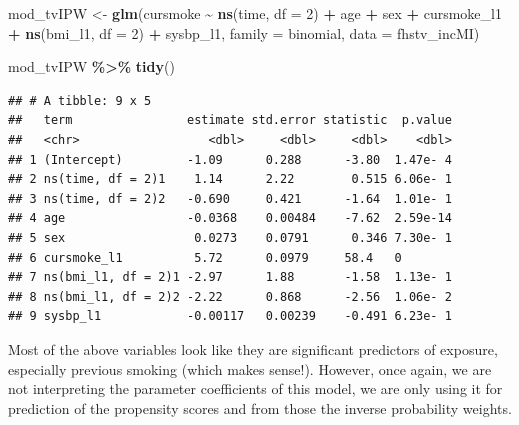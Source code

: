 \documentclass[
]{book}
\newenvironment{Shaded}{\begin{snugshade}}{\end{snugshade}}
\newcommand{\AttributeTok}[1]{\textcolor[rgb]{0.13,0.29,0.53}{#1}}
\newcommand{\DecValTok}[1]{\textcolor[rgb]{0.00,0.00,0.81}{#1}}
\newcommand{\FunctionTok}[1]{\textcolor[rgb]{0.13,0.29,0.53}{\textbf{#1}}}
\newcommand{\NormalTok}[1]{#1}
\newcommand{\OtherTok}[1]{\textcolor[rgb]{0.56,0.35,0.01}{#1}}
\newcommand{\SpecialCharTok}[1]{\textcolor[rgb]{0.81,0.36,0.00}{\textbf{#1}}}
\begin{document}
\begin{Shaded}
\begin{Highlighting}[]
\NormalTok{mod\_tvIPW }\OtherTok{\textless{}{-}} \FunctionTok{glm}\NormalTok{(cursmoke }\SpecialCharTok{\textasciitilde{}} \FunctionTok{ns}\NormalTok{(time, }\AttributeTok{df =} \DecValTok{2}\NormalTok{) }\SpecialCharTok{+}\NormalTok{ age }\SpecialCharTok{+} 
\NormalTok{                   sex }\SpecialCharTok{+}\NormalTok{ cursmoke\_l1 }\SpecialCharTok{+} \FunctionTok{ns}\NormalTok{(bmi\_l1, }\AttributeTok{df =} \DecValTok{2}\NormalTok{) }\SpecialCharTok{+}
\NormalTok{                   sysbp\_l1, }\AttributeTok{family =}\NormalTok{ binomial, }\AttributeTok{data =}\NormalTok{ fhstv\_incMI)}

\NormalTok{mod\_tvIPW }\SpecialCharTok{\%\textgreater{}\%}
  \FunctionTok{tidy}\NormalTok{()}
\end{Highlighting}
\end{Shaded}

\begin{verbatim}
## # A tibble: 9 x 5
##   term                estimate std.error statistic  p.value
##   <chr>                  <dbl>     <dbl>     <dbl>    <dbl>
## 1 (Intercept)         -1.09      0.288      -3.80  1.47e- 4
## 2 ns(time, df = 2)1    1.14      2.22        0.515 6.06e- 1
## 3 ns(time, df = 2)2   -0.690     0.421      -1.64  1.01e- 1
## 4 age                 -0.0368    0.00484    -7.62  2.59e-14
## 5 sex                  0.0273    0.0791      0.346 7.30e- 1
## 6 cursmoke_l1          5.72      0.0979     58.4   0       
## 7 ns(bmi_l1, df = 2)1 -2.97      1.88       -1.58  1.13e- 1
## 8 ns(bmi_l1, df = 2)2 -2.22      0.868      -2.56  1.06e- 2
## 9 sysbp_l1            -0.00117   0.00239    -0.491 6.23e- 1
\end{verbatim}

Most of the above variables look like they are significant predictors of exposure, especially previous smoking (which makes sense!). However, once again, we are not interpreting the parameter coefficients of this model, we are only using it for prediction of the propensity scores and from those the inverse probability weights.
\end{document}
